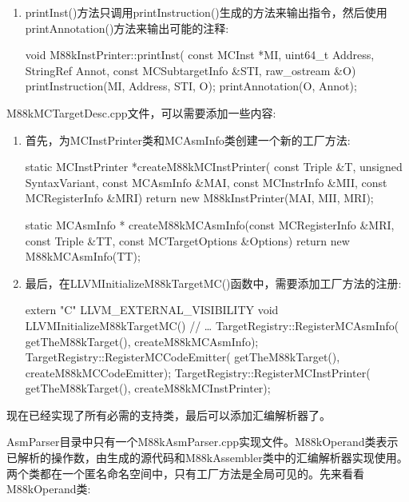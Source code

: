 \begin{enumerate}
\item
printInst()方法只调用printInstruction()生成的方法来输出指令，然后使用printAnnotation()方法来输出可能的注释:

\begin{cpp}
void M88kInstPrinter::printInst(
        const MCInst *MI, uint64_t Address, StringRef Annot,
        const MCSubtargetInfo &STI, raw_ostream &O) {
    printInstruction(MI, Address, STI, O);
    printAnnotation(O, Annot);
}
\end{cpp}
\end{enumerate}


M88kMCTargetDesc.cpp文件，可以需要添加一些内容:

\begin{enumerate}
\item
首先，为MCInstPrinter类和MCAsmInfo类创建一个新的工厂方法:

\begin{cpp}
static MCInstPrinter *createM88kMCInstPrinter(
        const Triple &T, unsigned SyntaxVariant,
        const MCAsmInfo &MAI, const MCInstrInfo &MII,
        const MCRegisterInfo &MRI) {
    return new M88kInstPrinter(MAI, MII, MRI);
}

static MCAsmInfo *
        createM88kMCAsmInfo(const MCRegisterInfo &MRI,
        const Triple &TT,
        const MCTargetOptions &Options) {
    return new M88kMCAsmInfo(TT);
}
\end{cpp}

\item
最后，在LLVMInitializeM88kTargetMC()函数中，需要添加工厂方法的注册:

\begin{cpp}
extern "C" LLVM_EXTERNAL_VISIBILITY void
LLVMInitializeM88kTargetMC() {
    // …
    TargetRegistry::RegisterMCAsmInfo(
        getTheM88kTarget(), createM88kMCAsmInfo);
    TargetRegistry::RegisterMCCodeEmitter(
        getTheM88kTarget(), createM88kMCCodeEmitter);
    TargetRegistry::RegisterMCInstPrinter(
        getTheM88kTarget(), createM88kMCInstPrinter);
}
\end{cpp}
\end{enumerate}

现在已经实现了所有必需的支持类，最后可以添加汇编解析器了。


AsmParser目录中只有一个M88kAsmParser.cpp实现文件。M88kOperand类表示已解析的操作数，由生成的源代码和M88kAssembler类中的汇编解析器实现使用。两个类都在一个匿名命名空间中，只有工厂方法是全局可见的。先来看看M88kOperand类:

